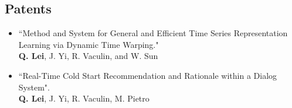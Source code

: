\documentclass[margin, 10pt]{res} %
\begin{document}
\begin{resume}
\begin{comment}
\item{Lemeng Wu, Mao Ye, \textbf{Qi Lei}, Jason D. Lee, and Qiang Liu. ``Steepest Descent Neural Architecture Optimization: Escaping Local Optimum with Signed Neural Splitting”, \textit{arXiv preprint}}

\item{ Minhao Cheng, \textbf{Qi Lei}, Pin-Yu Chen, Inderjit Dhillon, Cho-Jui Hsieh. ``CAT: Customized Adversarial Training for Improved Robustness”, \textit{arXiv preprint}}


\end{enumerate} 
\end{comment} 

\section{Patents}\begin{itemize}
	\item{``Method and System for General and Efficient Time Series Representation 
		Learning via Dynamic Time Warping."\\
		\textbf{Q. Lei}, J. Yi, R. Vaculin, and W. Sun}
	
	\item{``Real-Time Cold Start Recommendation and Rationale within a Dialog System".\\
		\textbf{Q. Lei}, J. Yi, R. Vaculin, M. Pietro}
\end{itemize}
\begin{comment}
\section{SOFTWARE}
 \textit{Github: }\url{https://github.com/cecilialeiqi/}\\
 {\sl SPIRAL} \hfill May 2016 - July 2017
 \begin{itemize}
   \item Feature representation learning of any time series data
    \end{itemize}
 {\sl DDI} \hfill Jan 2017 - May 2017
 \begin{itemize}
   \item Use an inductive tensor completion based methods to predict drug-drug interactions
   \end{itemize}
   {\sl NUTF} \hfill August 2016 - February 2017
   \begin{itemize}
     \item Negative-Unlabeled Tensor Factorization for Location\ Context 
       Inference from Inaccurate Mobility Data
      \end{itemize}
 \end{itemize} 
\end{comment}


\end{resume}
\end{document}
